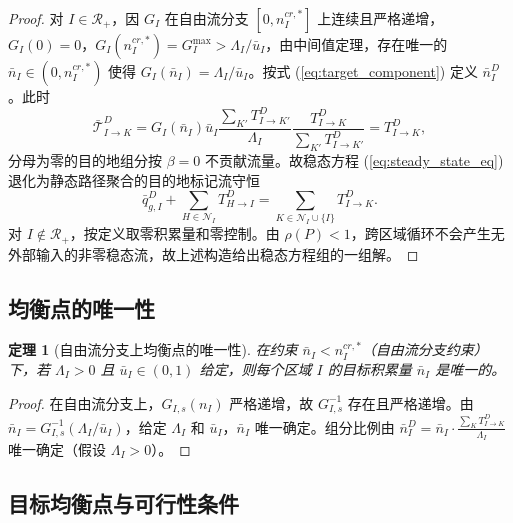 \documentclass[a4paper,12pt]{article}
\theoremstyle{plain}
\newtheorem{theorem}{定理}[section]
\theoremstyle{definition}
\theoremstyle{remark}
\begin{document}
\begin{proof}
对 $I\in\mathcal R_+$，因 $G_I$ 在自由流分支 $[0, n_I^{cr,*}]$ 上连续且严格递增，$G_I(0)=0$，$G_I(n_I^{cr,*})=G_I^{\max}>\Lambda_I/\bar u_I$，由中间值定理，存在唯一的 $\bar n_I\in(0,n_I^{cr,*})$ 使得 $G_I(\bar n_I)=\Lambda_I/\bar u_I$。按式 (\ref{eq:target_component}) 定义 $\bar n_I^D$。此时
\begin{equation}
    \bar{\mathcal T}_{I\to K}^D
    =
    G_I(\bar n_I)\bar u_I
    \frac{\sum_{K'}T_{I\to K'}^D}{\Lambda_I}
    \frac{T_{I\to K}^D}{\sum_{K'}T_{I\to K'}^D}
    =
    T_{I\to K}^D ,
\end{equation}
分母为零的目的地组分按 $\beta=0$ 不贡献流量。故稳态方程 (\ref{eq:steady_state_eq}) 退化为静态路径聚合的目的地标记流守恒
\begin{equation}
    \bar q_{g,I}^D+\sum_{H\in\mathcal N_I}T_{H\to I}^D
    =
    \sum_{K\in\mathcal N_I\cup\{I\}}T_{I\to K}^D .
\end{equation}
对 $I\notin\mathcal R_+$，按定义取零积累量和零控制。由 $\rho(P)<1$，跨区域循环不会产生无外部输入的非零稳态流，故上述构造给出稳态方程组的一组解。
\end{proof}

\subsection{均衡点的唯一性}

\begin{theorem}[自由流分支上均衡点的唯一性]\label{thm:equilibrium_uniqueness}
在约束 $\bar{n}_I < n_I^{cr,*}$（自由流分支约束）下，若 $\Lambda_I > 0$ 且 $\bar u_I\in(0,1)$ 给定，则每个区域 $I$ 的目标积累量 $\bar{n}_I$ 是唯一的。
\end{theorem}

\begin{proof}
在自由流分支上，$G_{I,s}(n_I)$ 严格递增，故 $G_{I,s}^{-1}$ 存在且严格递增。由 $\bar{n}_I = G_{I,s}^{-1}(\Lambda_I/\bar u_I)$，给定 $\Lambda_I$ 和 $\bar u_I$，$\bar{n}_I$ 唯一确定。组分比例由 $\bar{n}_I^D = \bar{n}_I \cdot \frac{\sum_K T_{I \to K}^D}{\Lambda_I}$ 唯一确定（假设 $\Lambda_I > 0$）。
\end{proof}

\subsection{目标均衡点与可行性条件}
\end{document}
